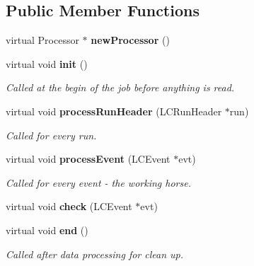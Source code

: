 \subsection*{Public Member Functions}
\begin{DoxyCompactItemize}
\item 
virtual Processor $\ast$ {\bfseries new\-Processor} ()\label{classScECALDigitizer_afc1b1dc86364bd86e8434521f0d14a8e}

\item 
virtual void {\bf init} ()
\begin{DoxyCompactList}\small\item\em Called at the begin of the job before anything is read. \end{DoxyCompactList}\item 
virtual void {\bf process\-Run\-Header} (L\-C\-Run\-Header $\ast$run)\label{classScECALDigitizer_adf8adb4733c400a5ceb5f345d2b00058}

\begin{DoxyCompactList}\small\item\em Called for every run. \end{DoxyCompactList}\item 
virtual void {\bf process\-Event} (L\-C\-Event $\ast$evt)\label{classScECALDigitizer_a68882c5b15e60cef5cb8524e5c14c1fb}

\begin{DoxyCompactList}\small\item\em Called for every event -\/ the working horse. \end{DoxyCompactList}\item 
virtual void {\bfseries check} (L\-C\-Event $\ast$evt)\label{classScECALDigitizer_afe24458ee3d08501d2ceb7e60a262f21}

\item 
virtual void {\bf end} ()\label{classScECALDigitizer_a8194e795626a3b1b85c792d9333485a3}

\begin{DoxyCompactList}\small\item\em Called after data processing for clean up. \end{DoxyCompactList}\end{DoxyCompactItemize}

